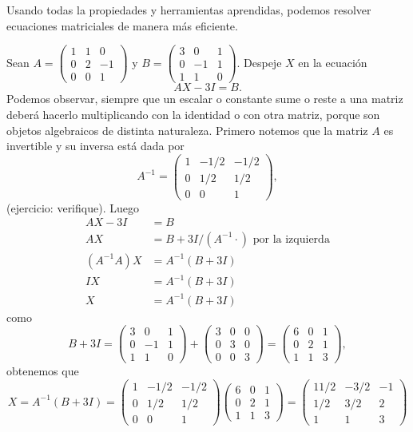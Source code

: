 Usando todas la propiedades y herramientas aprendidas, podemos resolver ecuaciones matriciales de manera m\'as eficiente.

\begin{ejem}
Sean $A = \begin{pmatrix}  1 & 1 & 0 \\ 0 & 2 & -1\\  0 & 0 & 1 \end{pmatrix}$ y $B = \begin{pmatrix}  3 & 0 & 1 \\ 0 & -1 & 1\\  1 & 1 & 0 \end{pmatrix}$. Despeje $X$ en la ecuaci\'on 
\[AX-3I=B.\]
Podemos observar, siempre que un escalar o constante sume o reste a una matriz deberá hacerlo
multiplicando con la identidad o con otra matriz, porque son objetos algebraicos de distinta naturaleza.
Primero notemos que la matriz $A$ es invertible y su inversa est\'a dada por 
\[A^{-1} = \begin{pmatrix}  1 & -1/2 & -1/2 \\ 0 & 1/2 & 1/2\\  0 & 0 & 1 \end{pmatrix},\]
(ejercicio: verifique). Luego
\begin{align*}
    AX-3I&=B\\
    AX&=B+3I /( A^{-1}\cdot) \text{ por la izquierda}\\
    (A^{-1}A)X&=A^{-1}(B+3I)\\
    IX&=A^{-1}(B+3I)\\
    X&=A^{-1}(B+3I)
\end{align*}
como 
\[B+3I=\begin{pmatrix}  3 & 0 & 1 \\ 0 & -1 & 1\\  1 & 1 & 0 \end{pmatrix}+\begin{pmatrix}  3 & 0 & 0 \\ 0 & 3 & 0\\  0 & 0 & 3 \end{pmatrix}=\begin{pmatrix}  6 & 0 & 1 \\ 0 & 2 & 1\\  1 & 1 & 3 \end{pmatrix},\]
obtenemos que 
\[X=A^{-1}(B+3I)=\begin{pmatrix}  1 & -1/2 & -1/2 \\ 0 & 1/2 & 1/2\\  0 & 0 & 1 \end{pmatrix}\begin{pmatrix}  6 & 0 & 1 \\ 0 & 2 & 1\\  1 & 1 & 3 \end{pmatrix}=\begin{pmatrix}  11/2 & -3/2 & -1 \\ 1/2 & 3/2 & 2\\  1 & 1 & 3 \end{pmatrix}\]
\end{ejem}

